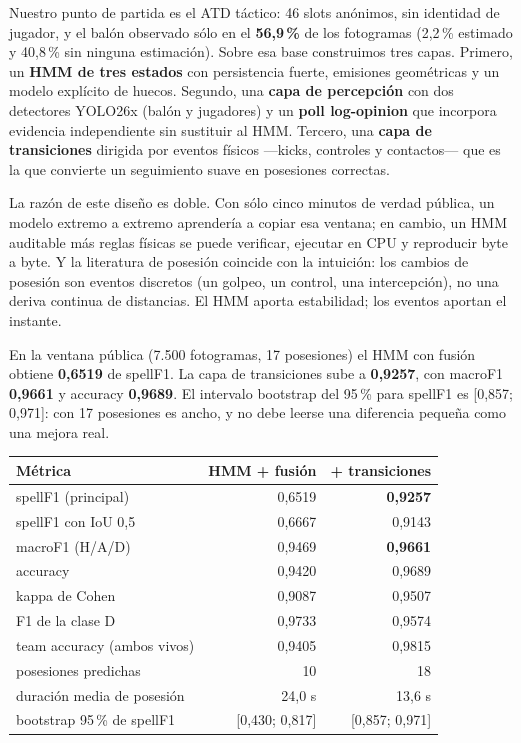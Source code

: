 \documentclass[10pt,a4paper]{article}
\begin{document}
Nuestro punto de partida es el ATD táctico: 46 slots anónimos, sin identidad de jugador, y el
balón observado sólo en el \textbf{56,9\,\%} de los fotogramas (2,2\,\% estimado y 40,8\,\% sin
ninguna estimación). Sobre esa base construimos tres capas. Primero, un \textbf{HMM de tres
estados} con persistencia fuerte, emisiones geométricas y un modelo explícito de huecos. Segundo,
una \textbf{capa de percepción} con dos detectores YOLO26x (balón y jugadores) y un \textbf{poll
log-opinion} que incorpora evidencia independiente sin sustituir al HMM. Tercero, una
\textbf{capa de transiciones} dirigida por eventos físicos ---kicks, controles y contactos--- que
es la que convierte un seguimiento suave en posesiones correctas.

La razón de este diseño es doble. Con sólo cinco minutos de verdad pública, un modelo extremo a
extremo aprendería a copiar esa ventana; en cambio, un HMM auditable más reglas físicas se puede
verificar, ejecutar en CPU y reproducir byte a byte. Y la literatura de posesión coincide con la
intuición: los cambios de posesión son eventos discretos (un golpeo, un control, una intercepción),
no una deriva continua de distancias. El HMM aporta estabilidad; los eventos aportan el instante.

En la ventana pública (7.500 fotogramas, 17 posesiones) el HMM con fusión obtiene
\textbf{0,6519} de spellF1. La capa de transiciones sube a \textbf{0,9257}, con macroF1
\textbf{0,9661} y accuracy \textbf{0,9689}. El intervalo bootstrap del 95\,\% para spellF1 es
[0,857; 0,971]: con 17 posesiones es ancho, y no debe leerse una diferencia pequeña como una
mejora real.

\begin{center}
\small
{}
\label{tab:metrics}
\begin{tabular}{lrr}
\toprule
Métrica & HMM + fusión & \textbf{+ transiciones} \\
\midrule
spellF1 (principal) & 0,6519 & \textbf{0,9257} \\
spellF1 con IoU 0,5 & 0,6667 & 0,9143 \\
macroF1 (H/A/D) & 0,9469 & \textbf{0,9661} \\
accuracy & 0,9420 & 0,9689 \\
kappa de Cohen & 0,9087 & 0,9507 \\
F1 de la clase D & 0,9733 & 0,9574 \\
team accuracy (ambos vivos) & 0,9405 & 0,9815 \\
posesiones predichas & 10 & 18 \\
duración media de posesión & 24,0 s & 13,6 s \\
bootstrap 95\,\% de spellF1 & [0,430; 0,817] & [0,857; 0,971] \\
\bottomrule
\end{tabular}
\end{center}
\end{document}
